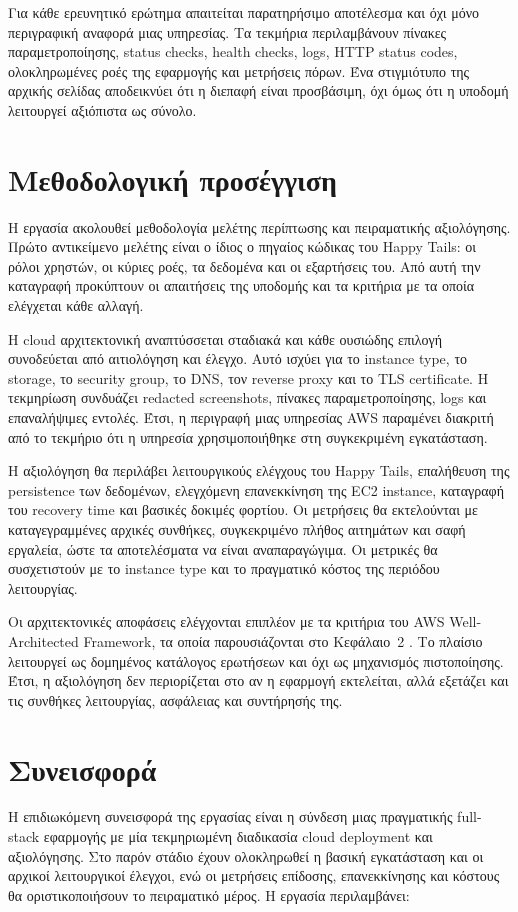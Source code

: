 Για κάθε ερευνητικό ερώτημα απαιτείται παρατηρήσιμο αποτέλεσμα και όχι μόνο
περιγραφική αναφορά μιας υπηρεσίας. Τα τεκμήρια περιλαμβάνουν πίνακες
παραμετροποίησης, status checks, health checks, logs, HTTP status codes,
ολοκληρωμένες ροές της εφαρμογής και μετρήσεις πόρων. Ένα στιγμιότυπο της
αρχικής σελίδας αποδεικνύει ότι η διεπαφή είναι προσβάσιμη, όχι όμως ότι η
υποδομή λειτουργεί αξιόπιστα ως σύνολο.

\section{Μεθοδολογική προσέγγιση}
Η εργασία ακολουθεί μεθοδολογία μελέτης περίπτωσης και πειραματικής
αξιολόγησης. Πρώτο αντικείμενο μελέτης είναι ο ίδιος ο πηγαίος κώδικας του
Happy Tails: οι ρόλοι χρηστών, οι κύριες ροές, τα δεδομένα και οι εξαρτήσεις
του. Από αυτή την καταγραφή προκύπτουν οι απαιτήσεις της υποδομής και τα
κριτήρια με τα οποία ελέγχεται κάθε αλλαγή.

Η cloud αρχιτεκτονική αναπτύσσεται σταδιακά και κάθε ουσιώδης επιλογή
συνοδεύεται από αιτιολόγηση και έλεγχο. Αυτό ισχύει για το instance type, το
storage, το security group, το DNS, τον reverse proxy και το TLS certificate.
Η τεκμηρίωση συνδυάζει redacted screenshots, πίνακες παραμετροποίησης, logs
και επαναλήψιμες εντολές. Έτσι, η περιγραφή μιας υπηρεσίας AWS παραμένει
διακριτή από το τεκμήριο ότι η υπηρεσία χρησιμοποιήθηκε στη συγκεκριμένη
εγκατάσταση.

Η αξιολόγηση θα περιλάβει λειτουργικούς ελέγχους του Happy Tails, επαλήθευση
της persistence των δεδομένων, ελεγχόμενη επανεκκίνηση της EC2 instance,
καταγραφή του recovery time και βασικές δοκιμές φορτίου. Οι μετρήσεις θα
εκτελούνται με καταγεγραμμένες αρχικές συνθήκες, συγκεκριμένο πλήθος
αιτημάτων και σαφή εργαλεία, ώστε τα αποτελέσματα να είναι αναπαραγώγιμα.
Οι μετρικές θα συσχετιστούν με το instance type και το πραγματικό κόστος της
περιόδου λειτουργίας.

Οι αρχιτεκτονικές αποφάσεις ελέγχονται επιπλέον με τα κριτήρια του AWS
Well-Architected Framework, τα οποία παρουσιάζονται στο Κεφάλαιο~2
\cite{aws2024wellarchitected}. Το πλαίσιο λειτουργεί ως δομημένος κατάλογος
ερωτήσεων και όχι ως μηχανισμός πιστοποίησης. Έτσι, η αξιολόγηση δεν
περιορίζεται στο αν η εφαρμογή εκτελείται, αλλά εξετάζει και τις συνθήκες
λειτουργίας, ασφάλειας και συντήρησής της.

\section{Συνεισφορά}
Η επιδιωκόμενη συνεισφορά της εργασίας είναι η σύνδεση μιας πραγματικής
full-stack εφαρμογής με μία τεκμηριωμένη διαδικασία cloud deployment και
αξιολόγησης. Στο παρόν στάδιο έχουν ολοκληρωθεί η βασική εγκατάσταση και οι
αρχικοί λειτουργικοί έλεγχοι, ενώ οι μετρήσεις επίδοσης, επανεκκίνησης και
κόστους θα οριστικοποιήσουν το πειραματικό μέρος. Η εργασία περιλαμβάνει:

